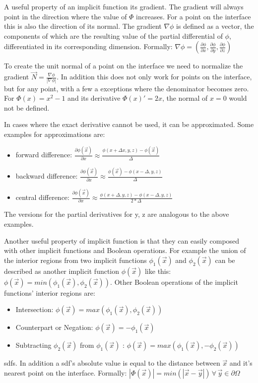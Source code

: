 A useful property of an implicit function its gradient. The gradient will always point in the direction where the value of $\Phi$ increases. For a point on the interface this is also the direction of its normal. The gradient $\nabla\phi$ is defined as a vector, the components of which are the resulting value of the partial differential of $\phi$, differentiated in its corresponding dimension. Formally: $\nabla\phi = (\frac{\partial\phi}{\partial x},\frac{\partial\phi}{\partial y},\frac{\partial\phi}{\partial z})$ 

To create the unit normal of a point on the interface we need to normalize the gradient $\vec{N} = \frac{\nabla\phi}{|\nabla\phi|}$. In addition this does not only work for points on the interface, but for any point, with a few a exceptions where the denominator becomes zero. For $\Phi(x) = x^2 - 1$ and its derivative $\Phi(x)' = 2x$, the normal of $x = 0$ would not be defined.

In cases where the exact derivative cannot be used, it can be approximated. Some examples for approximations are:
\begin{itemize}
	\item forward difference:  $\frac{\partial\phi(\vec{x})}{\partial x} \approx \frac{\phi(x+\Delta x, y, z) - \phi(\vec{x})}{\Delta}$
	\item backward difference: $\frac{\partial\phi(\vec{x})}{\partial x} \approx \frac{\phi(\vec{x}) - \phi(x-\Delta, y, z)}{\Delta}$
	\item central difference: $\frac{\partial\phi(\vec{x})}{\partial x} \approx \frac{\phi(x+\Delta, y, z) - \phi(x-\Delta, y, z)}{2*\Delta}$
\end{itemize}

The versions for the partial derivatives for y, z are analogous to the above examples.


Another useful property of implicit function is that they can easily composed with other implicit functions and Boolean operations. For example the union of the interior regions from two implicit functions $\phi_1(\vec{x})$ and $\phi_2(\vec{x})$ can be described as another implicit function $\phi(\vec{x})$ like this: $\phi(\vec{x}) = min(\phi_1(\vec{x}), \phi_2(\vec{x}))$. Other Boolean operations of the implicit functions' interior regions are:
 
\begin{itemize}
	\item Intersection:  $\phi(\vec{x}) = max(\phi_1(\vec{x}), \phi_2(\vec{x}))$
	\item Counterpart or Negation: $\phi(\vec{x}) = -\phi_1(\vec{x})$ 
	\item Subtracting $\phi_2(\vec{x})$ from $\phi_1(\vec{x})$ :  $\phi(\vec{x}) = max(\phi_1(\vec{x}), -\phi_2(\vec{x}))$
\end{itemize}



\glspl{sdf}.
In addition a \gls{sdf}'s absolute value is equal to the distance between $\vec{x}$ and it's nearest point on the interface. Formally:  $|\Phi(\vec{x})| = min(|\vec{x} - \vec{y}|) \, \forall \, \vec{y} \in \partial\Omega$








